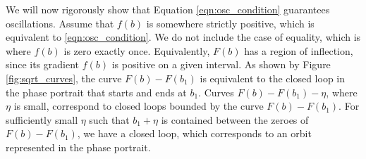 We will now rigorously show that Equation \ref{eqn:osc_condition} guarantees oscillations.
Assume that $f(b)$ is somewhere strictly positive, which is equivalent to \ref{eqn:osc_condition}.
We do not include the case of equality,
which is where $f(b)$ is zero exactly once.
Equivalently, $F(b)$ has a region of inflection,
since its gradient $f(b)$ is positive on a given interval.
As shown by Figure \ref{fig:sqrt_curves},
the curve $F(b)-F(b_1)$ is equivalent to the closed loop in the phase portrait that starts and ends at $b_1$.
Curves $F(b)-F(b_1)-\eta$, where $\eta$ is small,
correspond to closed loops bounded by the curve $F(b)-F(b_1)$.
For sufficiently small $\eta$ such that $b_1+\eta$ is contained between the zeroes of $F(b)-F(b_1)$,
we have a closed loop, which corresponds to an orbit represented in the phase portrait.








%
%

%
